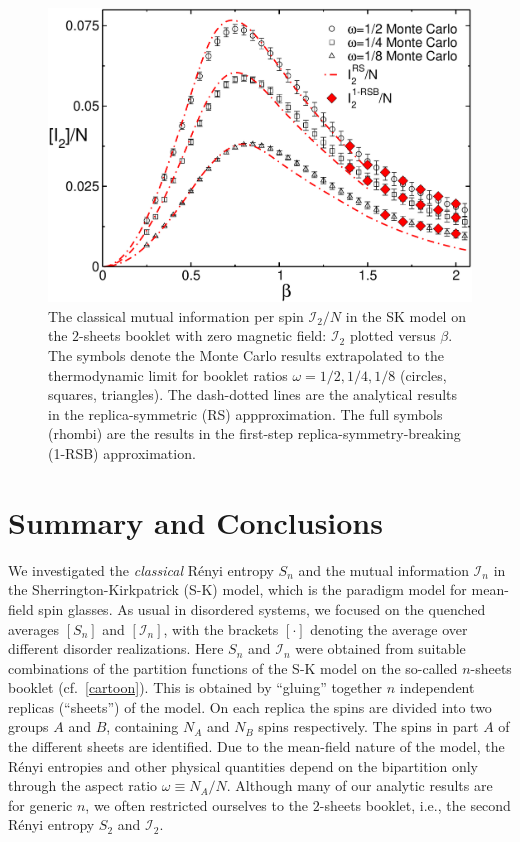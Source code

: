 \documentclass[twocolumn,superscriptaddress,prb,10pt]{revtex4-1}
\begin{document}
\begin{figure}[t]
\includegraphics*[width=0.93\linewidth]{./draft_figs/I2_extrapolated}
\caption{ The classical mutual information per spin ${\mathcal I}_2/N$ 
 in the SK model on the $2$-sheets booklet with zero magnetic field: 
 ${\mathcal I}_2$ plotted versus $\beta$. The symbols denote the 
 Monte Carlo results extrapolated to the thermodynamic limit for 
 booklet ratios $\omega=1/2,1/4,1/8$ (circles, squares, triangles). 
 The dash-dotted lines are the analytical results in the 
 replica-symmetric (RS) appproximation. The full symbols (rhombi) 
 are the results in the first-step replica-symmetry-breaking (1-RSB) 
 approximation.
}
\label{I2-extrapolated}
\end{figure}


\section{Summary and Conclusions}
\label{conclusions}

We investigated the \emph{classical} R\'enyi entropy $S_n$ and the mutual information 
${\mathcal I}_n$ in the Sherrington-Kirkpatrick (S-K) model, which is the paradigm model 
for mean-field spin glasses. As usual in disordered systems, we focused on the quenched 
averages $[S_n]$ and $[{\mathcal I}_n]$, with the brackets $[\cdot]$ denoting the average 
over different disorder realizations. Here $S_n$ and ${\mathcal I}_n$ were obtained 
from suitable combinations of the partition functions of the S-K model on the 
so-called $n$-sheets booklet (cf.~\ref{cartoon}). This is obtained by ``gluing'' together 
$n$ independent replicas (``sheets'') of the model. On each replica the spins are 
divided into two groups $A$ and $B$, containing $N_A$ and $N_B$ spins respectively. The 
spins in part $A$ of the different sheets are identified. Due to the mean-field nature of 
the model, the R\'enyi entropies and other physical quantities depend on the bipartition 
only through the aspect ratio $\omega\equiv N_A/N$. Although many of our analytic results 
are for generic $n$, we often restricted ourselves to the $2$-sheets booklet, i.e., the 
second R\'enyi entropy $S_2$ and ${\mathcal I}_2$. 
\end{document}

